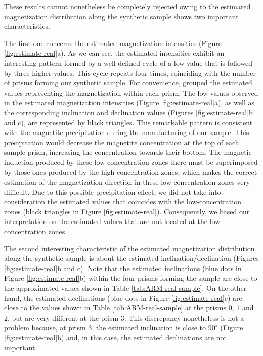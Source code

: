 \documentclass[galley,gc]{agutex}
\begin{document}
\begin{article}
These results cannot nonetheless be completely rejected owing to
the estimated magnetization
distribution along the synthetic sample shows two important 
characteristics. 

The first one concerns the estimated magnetization intensities 
(Figure \ref{fig:estimate-real}a).
As we can see, the estimated intensities exhibit an interesting pattern 
formed by a well-defined cycle of a low value that is followed by three higher 
values. This cycle repeats four times,
coinciding with the number of prisms forming our synthetic
sample.
For convenience, grouped the estimated values representing
the magnetization within each prism.
The low values observed in the estimated magnetization intensities
(Figure \ref{fig:estimate-real}a), as well
as the corresponding inclination and declination values
(Figures \ref{fig:estimate-real}b and c), are represented by black
triangles.
This remarkable pattern is consistent with the 
magnetite precipitation during the manufacturing of our sample.
This precipitation would decrease the magnetite concentration at the
top of each sample prism, increasing the concentration towards
their bottom.
The magnetic induction produced by these low-concentration zones
there must be superimposed by those ones produced by the 
high-concentration zones, which makes the correct estimation 
of the magnetization direction in these low-concentration zones 
very difficult.
Due to this possible precipitation effect, 
we did not take into consideration the estimated values that coincides
with the low-concentration zones 
(black triangles in Figure \ref{fig:estimate-real}). Consequently,
we based our interpretation on the estimated values that are 
not located at the low-concentration zones.

The second interesting characteristic of the estimated magnetization
distribution along the synthetic sample is about the estimated
inclination/declination (Figures \ref{fig:estimate-real}b and c).
Note that the estimated inclinations (blue dots in Figure 
\ref{fig:estimate-real}b) within the four prisms forming
the sample are close to the approximated values shown in Table 
\ref{tab:ARM-real-sample}.
On the other hand, the estimated declinations (blue dots in Figure 
\ref{fig:estimate-real}c) are close to the values shown in Table 
\ref{tab:ARM-real-sample} at the prisms $0$, $1$ and $2$, but are 
very different at the prism $3$.
This discrepancy nonetheless is not a problem because, at prism $3$,
the estimated inclination is close to $90^{\circ}$ (Figure
\ref{fig:estimate-real}b) and, in this case, the estimated declinations
are not important.


\end{article}
\end{document}
